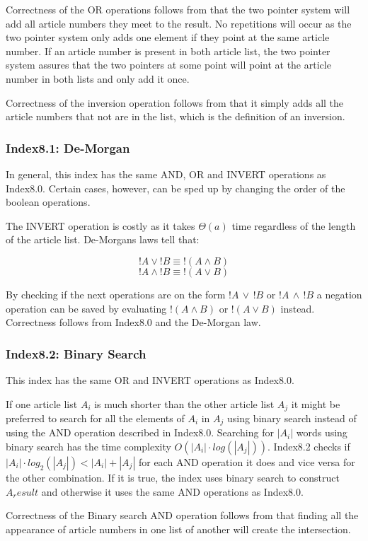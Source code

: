 Correctness of the OR operations follows from that the two pointer system will add all article numbers they meet to the result. No repetitions will occur as the two pointer system only adds one element if they point at the same article number. If an article number is present in both article list, the two pointer system assures that the two pointers at some point will point at the article number in both lists and only add it once.

Correctness of the inversion operation follows from that it simply adds all the article numbers that not are in the list, which is the definition of an inversion.

\subsubsection{Index8.1: De-Morgan}
In general, this index has the same AND, OR and INVERT operations as Index8.0. Certain cases, however, can be sped up by changing the order of the boolean operations.

The INVERT operation is costly as it takes $\Theta(a)$ time regardless of the length of the article list. De-Morgans laws tell that:

$$!A \vee ! B \equiv !(A \wedge B)$$
$$!A \wedge ! B \equiv !(A \vee B)$$

By checking if the next operations are on the form $!A\, \vee\, !B$ or $!A\, \wedge\, ! B$ a negation operation can be saved by evaluating $!(A \wedge B)$ or $!(A \vee B)$ instead. Correctness follows from Index8.0 and the De-Morgan law.

\subsubsection{Index8.2: Binary Search}
This index has the same OR and INVERT operations as Index8.0.

If one article list $A_i$ is much shorter than the other article list $A_j$ it might be preferred to search for all the elements of $A_i$ in $A_j$ using binary search instead of using the AND operation described in Index8.0. Searching for $|A_i|$ words using binary search has the time complexity $O(|A_i| \cdot log(|A_j|))$. Index8.2 checks if $|A_i| \cdot log_2(|A_j|) < |A_i| + |A_j|$ for each AND operation it does and vice versa for the other combination. If it is true, the index uses binary search to construct $A_result$ and otherwise it uses the same AND operations as Index8.0. 

Correctness of the Binary search AND operation follows from that finding all the appearance of article numbers in one list of another will create the intersection.

